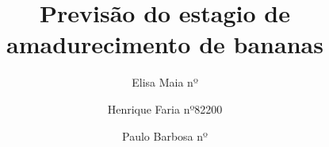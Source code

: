 %
\title{Previsão do estagio de amadurecimento de bananas}
%
%
\author{ Elisa Maia nº \and Henrique Faria nº82200 \and Paulo Barbosa nº }
%
%
%
\maketitle              %
%
\begin{abstract}

\keywords{}
\end{abstract}
%
%







